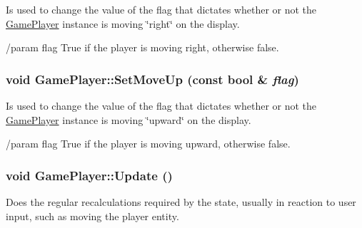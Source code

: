 Is used to change the value of the flag that dictates whether or not the \hyperlink{class_game_player}{GamePlayer} instance is moving \char`\"{}right\char`\"{} on the display.

/param flag True if the player is moving right, otherwise false. \hypertarget{class_game_player_7f790b23e90b709061b91f840dce4982}{
\subsubsection[{SetMoveUp}]{\setlength{\rightskip}{0pt plus 5cm}void GamePlayer::SetMoveUp (const bool \& {\em flag})}}
\label{d7/df6/class_game_player_7f790b23e90b709061b91f840dce4982}


Is used to change the value of the flag that dictates whether or not the \hyperlink{class_game_player}{GamePlayer} instance is moving \char`\"{}upward\char`\"{} on the display.

/param flag True if the player is moving upward, otherwise false. \hypertarget{class_game_player_55dbf88a7edd4c41de5591c0a3496847}{
\subsubsection[{Update}]{\setlength{\rightskip}{0pt plus 5cm}void GamePlayer::Update ()}}
\label{d7/df6/class_game_player_55dbf88a7edd4c41de5591c0a3496847}


Does the regular recalculations required by the state, usually in reaction to user input, such as moving the player entity. 
